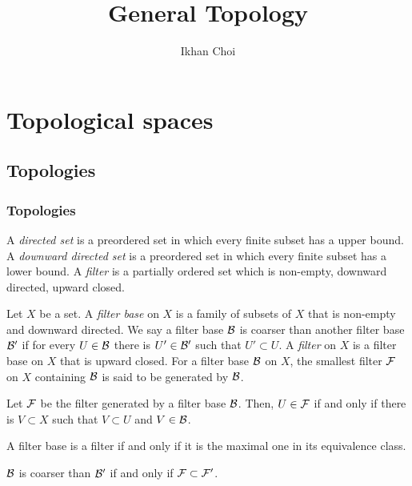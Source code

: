 \documentclass{../../large}
\begin{document}
\title{General Topology}
\author{Ikhan Choi}
\maketitle
\tableofcontents

\part{Topological spaces}


\chapter{Topologies}

\section{Topologies}

A \emph{directed set} is a preordered set in which every finite subset has a upper bound.
A \emph{downward directed set} is a preordered set in which every finite subset has a lower bound.
A \emph{filter} is a partially ordered set which is non-empty, downward directed, upward closed.


\begin{prb}[Filters]
Let $X$ be a set.
A \emph{filter base} on $X$ is a family of subsets of $X$ that is non-empty and downward directed.
We say a filter base $\mathcal{B}$ is coarser than another filter base $\mathcal{B}'$ if for every $U\in\mathcal{B}$ there is $U'\in\mathcal{B}'$ such that $U'\subset U$.
A \emph{filter} on $X$ is a filter base on $X$ that is upward closed.
For a filter base $\mathcal{B}$ on $X$, the smallest filter $\mathcal{F}$ on $X$ containing $\mathcal{B}$ is said to be generated by $\mathcal{B}$.
\begin{parts}
\item Let $\mathcal{F}$ be the filter generated by a filter base $\mathcal{B}$. Then, $U\in\mathcal{F}$ if and only if there is $V\subset X$ such that $V\subset U$ and $V\in\mathcal{B}$.
\item A filter base is a filter if and only if it is the maximal one in its equivalence class.
\item $\mathcal{B}$ is coarser than $\mathcal{B}'$ if and only if $\mathcal{F}\subset\mathcal{F}'$.
\end{parts}
\end{prb}
\end{document}
